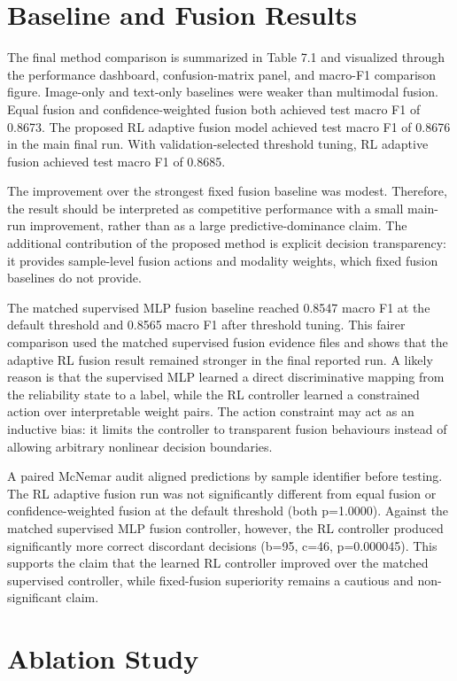 \section{Baseline and Fusion Results}


The final method comparison is summarized in Table 7.1 and visualized through the performance dashboard, confusion-matrix panel, and macro-F1 comparison figure. Image-only and text-only baselines were weaker than multimodal fusion. Equal fusion and confidence-weighted fusion both achieved test macro F1 of 0.8673. The proposed RL adaptive fusion model achieved test macro F1 of 0.8676 in the main final run. With validation-selected threshold tuning, RL adaptive fusion achieved test macro F1 of 0.8685.


The improvement over the strongest fixed fusion baseline was modest. Therefore, the result should be interpreted as competitive performance with a small main-run improvement, rather than as a large predictive-dominance claim. The additional contribution of the proposed method is explicit decision transparency: it provides sample-level fusion actions and modality weights, which fixed fusion baselines do not provide.


The matched supervised MLP fusion baseline reached 0.8547 macro F1 at the default threshold and 0.8565 macro F1 after threshold tuning. This fairer comparison used the matched supervised fusion evidence files and shows that the adaptive RL fusion result remained stronger in the final reported run. A likely reason is that the supervised MLP learned a direct discriminative mapping from the reliability state to a label, while the RL controller learned a constrained action over interpretable weight pairs. The action constraint may act as an inductive bias: it limits the controller to transparent fusion behaviours instead of allowing arbitrary nonlinear decision boundaries.

A paired McNemar audit aligned predictions by sample identifier before testing. The RL adaptive fusion run was not significantly different from equal fusion or confidence-weighted fusion at the default threshold (both p=1.0000). Against the matched supervised MLP fusion controller, however, the RL controller produced significantly more correct discordant decisions (b=95, c=46, p=0.000045). This supports the claim that the learned RL controller improved over the matched supervised controller, while fixed-fusion superiority remains a cautious and non-significant claim.


\section{Ablation Study}


